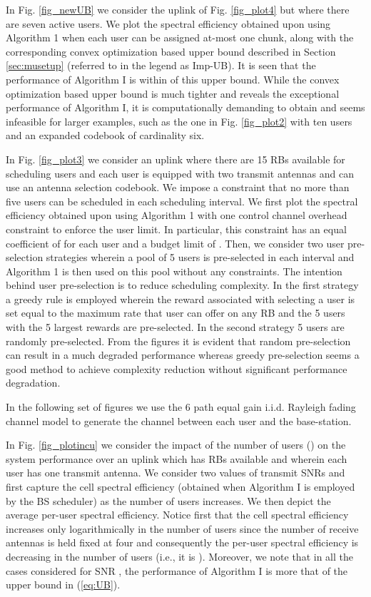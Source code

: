 \documentclass[11pt] {article}
\begin{document}
In Fig. \ref{fig_newUB} we consider the uplink of Fig. \ref{fig_plot4} but where there are seven active users.  We   plot the spectral efficiency obtained upon using Algorithm 1 when each user can be assigned at-most one chunk, along with the corresponding convex optimization based upper bound described in Section \ref{sec:musetup} (referred to in the legend as Imp-UB). It is seen that the performance of Algorithm I is within  of this upper bound. While the convex optimization based upper bound is much tighter and reveals the  exceptional performance of Algorithm I, it is computationally demanding to obtain and seems infeasible for larger examples, such as the one in Fig. \ref{fig_plot2} with ten users  and an expanded codebook of  cardinality six.


 In Fig. \ref{fig_plot3} we consider an uplink where there are 15 RBs available for scheduling users and each user is equipped with two transmit antennas and can use an antenna  selection codebook. We impose  a constraint that no more than five users can be scheduled in each scheduling interval. We first plot the spectral efficiency obtained upon using Algorithm 1 with   one control channel overhead constraint to enforce the user limit. In particular, this  constraint has an equal coefficient of  for each user and a budget limit of . Then, we consider two user pre-selection strategies wherein a pool of 5 users is pre-selected in each interval and Algorithm 1 is then used on this pool without any constraints. The intention behind user pre-selection is to reduce scheduling complexity. In the first strategy a greedy rule is employed wherein the reward associated with selecting a user is set equal to the maximum rate that user can offer on any RB and the 5 users with the 5 largest rewards are pre-selected. In the second strategy 5 users are randomly pre-selected. From the figures it is evident that random pre-selection can result in a much degraded performance whereas greedy pre-selection seems a good method to achieve complexity reduction without significant performance degradation.

In the following set of figures we use the 6 path equal gain i.i.d. Rayleigh fading channel model to generate the channel between each user and the base-station.

In Fig. \ref{fig_plotincu} we consider the impact of the number of users () on the system performance
over an uplink which has   RBs available and wherein each user has one transmit antenna.  We consider two values of  transmit SNRs and first capture the cell spectral efficiency (obtained when Algorithm I is employed by the BS scheduler) as the number of users increases. We then depict the average per-user spectral efficiency.
  Notice first  that the cell spectral efficiency increases only  logarithmically in the number of users since the number of receive antennas is held fixed at four and consequently the per-user spectral efficiency is decreasing in the number of users (i.e., it is ). Moreover, we note that in all the cases considered for SNR , the performance of Algorithm I is more that  of the upper bound in (\ref{eq:UB}).
\end{document}
